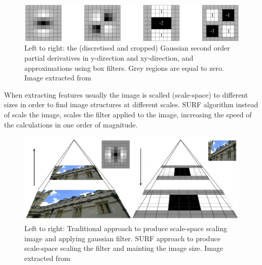 \begin{figure}[!h]
\begin{center}
\includegraphics[scale=0.35]{images/surf_mask}
\caption{Left to right: the (discretised and cropped) Gaussian second order partial derivatives 
in y-direction and xy-direction, and approximations using box filters. 
Grey regions are equal to zero. Image extracted from \cite{Bay06surf}}
\end{center}
\end{figure}

When extracting features usually the image is scalled (scale-space) to different sizes in order 
to find image structures 
at different scales. SURF algorithm instead of scale the image, scales the filter applied to the 
image, increasing the speed of the calculations in one order of magnitude.

\begin{figure}[!h]
\begin{center}
\includegraphics[scale=0.35]{images/surf_scale}
\caption{Left to right: Traditional approach to produce scale-space scaling image and applying gaussian filter. SURF approach to produce scale-space scaling the filter and mainting the image size. Image extracted from \cite{miguel}}
\end{center}
\end{figure}


